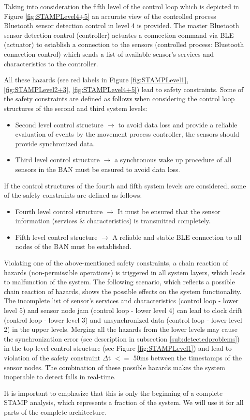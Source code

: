 \documentclass[review]{elsarticle}
\begin{document}
\begin{itemize}
    
	Taking into consideration the fifth level of the control loop which is depicted in Figure \ref{fig:STAMPLevel4+5} an accurate view of the controlled process Bluetooth sensor detection control in level 4 is provided. The master Bluetooth sensor detection control (controller) actuates a connection command via BLE (actuator) to establish a connection to the sensors (controlled process: Bluetooth connection control) which sends a list of available sensor's services and characteristics to the controller. 
	
	All these hazards (see red labels in Figure \ref{fig:STAMPLevel1}, \ref{fig:STAMPLevel2+3}, \ref{fig:STAMPLevel4+5}) lead to safety constraints.
	Some of the safety constraints are defined as follows when considering the control loop structures of the second and third system levels:
	\begin{itemize}
		\item Second level control structure $\rightarrow$ to avoid data loss and provide a reliable evaluation of events by the movement process controller, the sensors should provide synchronized data.
		\item Third level control structure $\rightarrow$ a synchronous wake up procedure of all sensors in the BAN must be ensured to avoid data loss.
	\end{itemize}
	If the control structures of the fourth and fifth system levels are considered, some of the safety constraints are defined as follows:
	\begin{itemize}
		\item Fourth level control structure $\rightarrow$ It must be ensured that the sensor information (services \& characteristics) is transmitted completely.
		\item Fifth level control structure $\rightarrow$ A reliable and stable BLE connection to all nodes of the BAN must be established.
	\end{itemize}
	Violating one of the above-mentioned safety constraints, a chain reaction of hazards (non-permissible operations) is triggered in all system layers, which leads to malfunction of the system.  The following scenario, which reflects a possible chain reaction of hazards, shows the possible effects on the system functionality.
	The incomplete list of sensor's services and characteristics (control loop - lower level 5) and sensor node jam (control loop - lower level 4) can lead to clock drift (control loop - lower level 3) and unsynchronized data (control loop - lower level 2) in the upper levels. Merging all the hazards from the lower levels may cause the synchronization error (see description in subsection \ref{sub:detectedproblems}) in the top level control structure (see Figure \ref{fig:STAMPLevel1}) and lead to violation of the safety constraint $\Delta$t $<=$ 50ms between the timestamps of the sensor nodes. The combination of these possible hazards makes the system inoperable to detect falls in real-time.
	
\end{itemize}
	It is important to emphasize that this is only the beginning of a complete STAMP analysis, which represents a fraction of the system.  We will use it for all parts of the complete architecture.
	
\end{document}
